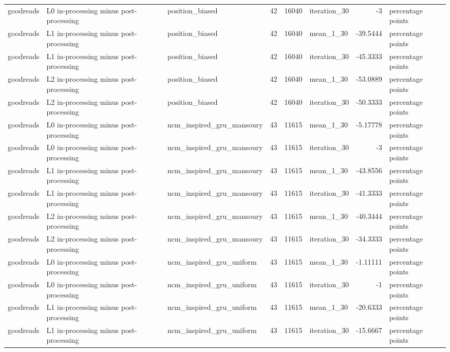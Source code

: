 \begin{table}[htbp!]
\begin{tabular}{lllrrlrl}
goodreads & L0 in-processing minus post-processing & position\_biased & 42 & 16040 & iteration\_30 & -3 & percentage points \\
goodreads & L1 in-processing minus post-processing & position\_biased & 42 & 16040 & mean\_1\_30 & -39.5444 & percentage points \\
goodreads & L1 in-processing minus post-processing & position\_biased & 42 & 16040 & iteration\_30 & -45.3333 & percentage points \\
goodreads & L2 in-processing minus post-processing & position\_biased & 42 & 16040 & mean\_1\_30 & -53.0889 & percentage points \\
goodreads & L2 in-processing minus post-processing & position\_biased & 42 & 16040 & iteration\_30 & -50.3333 & percentage points \\
goodreads & L0 in-processing minus post-processing & ncm\_inspired\_gru\_mansoury & 43 & 11615 & mean\_1\_30 & -5.17778 & percentage points \\
goodreads & L0 in-processing minus post-processing & ncm\_inspired\_gru\_mansoury & 43 & 11615 & iteration\_30 & -3 & percentage points \\
goodreads & L1 in-processing minus post-processing & ncm\_inspired\_gru\_mansoury & 43 & 11615 & mean\_1\_30 & -43.8556 & percentage points \\
goodreads & L1 in-processing minus post-processing & ncm\_inspired\_gru\_mansoury & 43 & 11615 & iteration\_30 & -41.3333 & percentage points \\
goodreads & L2 in-processing minus post-processing & ncm\_inspired\_gru\_mansoury & 43 & 11615 & mean\_1\_30 & -40.3444 & percentage points \\
goodreads & L2 in-processing minus post-processing & ncm\_inspired\_gru\_mansoury & 43 & 11615 & iteration\_30 & -34.3333 & percentage points \\
goodreads & L0 in-processing minus post-processing & ncm\_inspired\_gru\_uniform & 43 & 11615 & mean\_1\_30 & -1.11111 & percentage points \\
goodreads & L0 in-processing minus post-processing & ncm\_inspired\_gru\_uniform & 43 & 11615 & iteration\_30 & -1 & percentage points \\
goodreads & L1 in-processing minus post-processing & ncm\_inspired\_gru\_uniform & 43 & 11615 & mean\_1\_30 & -20.6333 & percentage points \\
goodreads & L1 in-processing minus post-processing & ncm\_inspired\_gru\_uniform & 43 & 11615 & iteration\_30 & -15.6667 & percentage points \\

\end{tabular}
\end{table}
